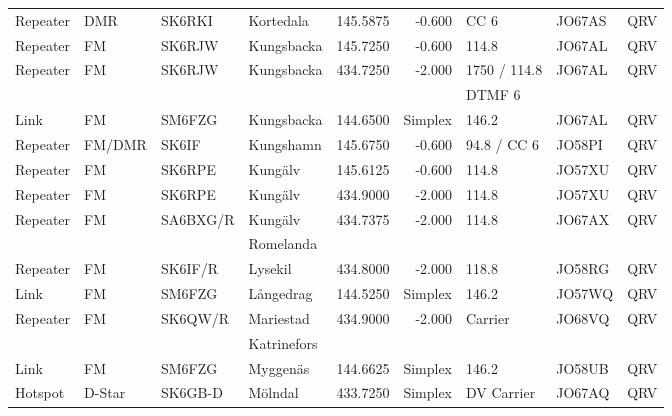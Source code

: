 \begin{landscape}
\begin{longtable}{llllrrlll}
Repeater & DMR       & SK6RKI   & Kortedala         & 145.5875     & -0.600     & CC 6         & JO67AS      & QRV      \\
Repeater & FM        & SK6RJW   & Kungsbacka        & 145.7250     & -0.600     & 114.8        & JO67AL      & QRV      \\
Repeater & FM        & SK6RJW   & Kungsbacka        & 434.7250     & -2.000     & 1750 / 114.8 & JO67AL      & QRV      \\
         &           &          &                   &              &            & DTMF 6       &             &          \\
Link     & FM        & SM6FZG   & Kungsbacka        & 144.6500     & Simplex    & 146.2        & JO67AL      & QRV      \\
Repeater & FM/DMR    & SK6IF    & Kungshamn         & 145.6750     & -0.600     & 94.8 / CC 6  & JO58PI      & QRV      \\
Repeater & FM        & SK6RPE   & Kungälv           & 145.6125     & -0.600     & 114.8        & JO57XU      & QRV      \\
Repeater & FM        & SK6RPE   & Kungälv           & 434.9000     & -2.000     & 114.8        & JO57XU      & QRV      \\
Repeater & FM        & SA6BXG/R & Kungälv           & 434.7375     & -2.000     & 114.8        & JO67AX      & QRV      \\
         &           &          & Romelanda         &              &            &              &             &          \\
Repeater & FM        & SK6IF/R  & Lysekil           & 434.8000     & -2.000     & 118.8        & JO58RG      & QRV      \\
Link     & FM        & SM6FZG   & Långedrag         & 144.5250     & Simplex    & 146.2        & JO57WQ      & QRV      \\
Repeater & FM        & SK6QW/R  & Mariestad         & 434.9000     & -2.000     & Carrier      & JO68VQ      & QRV      \\
         &           &          & Katrinefors       &              &            &              &             &          \\
Link     & FM        & SM6FZG   & Myggenäs          & 144.6625     & Simplex    & 146.2        & JO58UB      & QRV      \\
Hotspot  & D-Star    & SK6GB-D  & Mölndal           & 433.7250     & Simplex    & DV Carrier   & JO67AQ      & QRV      \\

\end{longtable}
\end{landscape}
